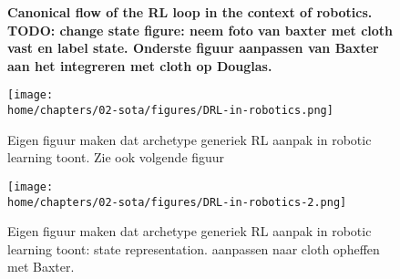 \documentclass[\home/main.tex]{subfiles}
\begin{document}
\begin{figure}[htb]
	\centering
	
	\caption{\textbf{Canonical flow of the RL loop in the context of robotics. TODO: change state figure: neem foto van baxter met cloth vast en label state. Onderste figuur aanpassen van Baxter aan het integreren met cloth op Douglas.}}
	\label{fig:RL_loop_robotics}
\end{figure}

\begin{figure}[htb]
	\texttt{[image: \\home/chapters/02-sota/figures/DRL-in-robotics.png]}
	\caption{Eigen figuur maken dat archetype generiek RL aanpak in robotic learning toont. Zie ook volgende figuur}
	\label{fig:lit_rl_loop}
\end{figure}
\begin{figure}[htb]
	\texttt{[image: \\home/chapters/02-sota/figures/DRL-in-robotics-2.png]}
	\caption{Eigen figuur maken dat archetype generiek RL aanpak in robotic learning toont: state representation. aanpassen naar cloth opheffen met Baxter.}
	\label{fig:lit_rl_loop2}
\end{figure}
\end{document}
